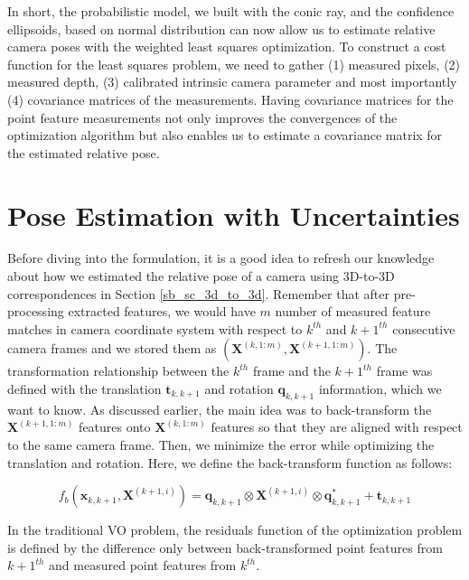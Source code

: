 \documentclass[12pt]{report}
\numberwithin{figure}{section}
\begin{document}
In short, the probabilistic model, we built with the conic ray, and the
confidence ellipsoids, based on normal distribution can now allow us to
estimate relative camera poses with the weighted least squares optimization.
To construct a cost function for the least squares problem, we need to gather
(1) measured pixels, (2) measured depth, (3) calibrated intrinsic camera
parameter and most importantly (4) covariance matrices of the measurements.
Having covariance matrices for the point feature measurements not only improves
the convergences of the optimization algorithm but also enables us to estimate
a covariance matrix for the estimated relative pose. 



\section{Pose Estimation with Uncertainties} \label{sc_rel_pose_est_w_uncertainty}

Before diving into the formulation, it is a good idea to refresh our knowledge
about how we estimated the relative pose of a camera using 3D-to-3D 
correspondences
in Section \ref{sb_sc_3d_to_3d}.  Remember that after pre-processing extracted
features, we would have $m$ number of measured feature matches in camera
coordinate system with respect to $k^{th}$ and $k+1^{th}$ consecutive camera
frames and we stored them as $(\mathbf{X}^{(k,1:m)},
\mathbf{X}^{(k+1,1:m)})$. 
The transformation relationship between the $k^{th}$ frame
and the $k+1^{th}$ frame was defined with the translation $\mathbf{t}_{k,k+1}$
and rotation $\mathbf{q}_{k,k+1}$ information, which we want to know.  As
discussed earlier, the main idea was to back-transform the
$\mathbf{X}^{(k+1,1:m)}$ features onto $\mathbf{X}^{(k,1:m)}$ features so
that they are aligned with respect to the same camera frame.  Then, we minimize
the error while optimizing the translation and rotation.  Here, we define the
back-transform function as follows:

\begin{equation} f_b(\mathbf{x}_{k,k+1}, \mathbf{X}^{(k+1,i)}) =
\mathbf{q}_{k,k+1} \otimes \mathbf{X}^{(k+1,i)} \otimes \mathbf{q}_{k,k+1}^*
+ \mathbf{t}_{k,k+1} \end{equation}

In the traditional VO problem, the residuals function of the optimization
problem is defined by the difference only between back-transformed point
features from $k+1^{th}$ and measured point features from $k^{th}$.
\end{document}
